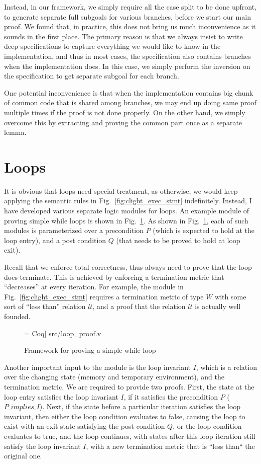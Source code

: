 Instead, in our framework, we simply require all the case split to be done upfront,
to generate separate full subgoals for various branches, before we start our main
proof. We found that, in practice, this does not bring us much inconvenience as
it sounds in the first place. The primary reason is that we always insist to
write deep specifications to capture everything we would like to know in the
implementation, and thus in most cases, the specification also contains branches
when the implementation does. In this case, we simply perform the inversion
on the specification to get separate subgoal for each branch.

One potential inconvenience is that when the implementation contains big
chunk of common code that is shared among branches, we may end up doing
same proof multiple times if the proof is not done properly. On the other
hand, we simply overcome this by extracting and proving the common part once
as a separate lemma.

\section{Loops}

It is obvious that loops need special treatment, as otherwise, we would keep
applying the semantic rules in Fig.~\ref{fig:clight_exec_stmt} indefinitely.
Instead, I have developed various separate logic modules for loops.
An example module of proving simple while loops is shown in Fig.~\ref{fig:loop_proof}.
As shown in Fig.~\ref{fig:loop_proof}, each of such modules is parameterized
over a precondition $P$ (which is expected to hold at the loop entry), and
a post condition $Q$ (that needs to be proved to hold at loop exit).

Recall that we enforce total correctness, thus always need to prove that
the loop does terminate. This is achieved by enforcing a termination metric that
``decreases'' at every iteration.
For example, the module in Fig.~\ref{fig:clight_exec_stmt} requires a termination
metric of type $W$ with some sort of ``less than'' relation $lt$, and a proof
that the relation $lt$ is actually well founded.


\begin{figure}
 = Coq] {src/loop_proof.v}
\caption{Framework for proving a simple while loop}
\label{fig:loop_proof}
\end{figure}

Another important input to the module is the loop invariant $I$, which is
a relation over the changing state (memory and temporary environment), and
the termination metric. We are required to provide two proofs.
First, the state at the loop entry satisfies the loop invariant $I$,
if it satisfies the precondition $P$ ($P\_implies\_I$).
Next, if the state before a particular iteration satisfies the loop
invariant, then either the loop condition evaluates to false, causing
the loop to exist with an exit state satisfying the post condition $Q$,
or the loop condition evaluates to true, and the loop continues, with
states after this loop iteration still satisfy the loop invariant $I$,
with a new termination metric that is ``less than`` the original one.

